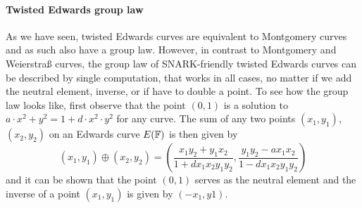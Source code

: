 \paragraph{Twisted Edwards group law}As we have seen, twisted Edwards curves are equivalent to Montgomery curves and as such also have a group law. However, in contrast to Montgomery and Weierstraß curves, the group law of SNARK-friendly twisted Edwards curves can be described by single computation, that works in all cases, no matter if we add the neutral element, inverse, or if have to double a point. To see how the group law looks like, first observe that the point $(0,1)$ is
a solution to $a\cdot x^{2} + y^2 =1+ d\cdot x^{2}\cdot y^2$ for any curve. The sum of any two points $(x_1, y_1)$, $(x_2, y_2)$ on an Edwards curve $E(\mathbb{F})$ is then given by
$$
(x_1, y_1) \oplus (x_2, y_2) =\left(\frac{x_1y_2+y_1x_2}{1 +dx_1x_2y_1y_2},\frac{y_1y_2-ax_1x_2}{1-dx_1x_2y_1y_2}\right)
$$
and it can be shown that the point $(0,1)$ serves as the neutral element and the inverse of a point $(x_1, y_1)$ is given by $(-x_1, y1)$.
